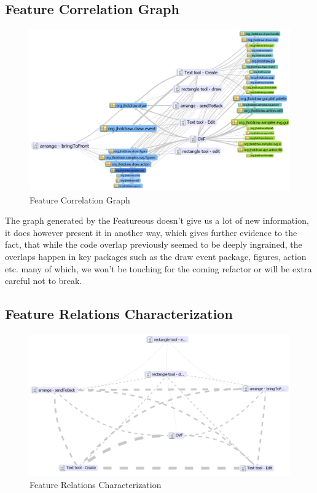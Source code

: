\subsection{Feature Correlation Graph}
\begin{figure}[H]
    \includegraphics[width=\textwidth]{Images/featureousgraph.png}
    \caption{Feature Correlation Graph}
\end{figure}
The graph generated by the Featureous doesn't give us a lot of new information, it does however present it in another way, which gives further evidence to the fact, that while the code overlap previously seemed to be deeply ingrained, the overlaps happen in key packages such as the draw event package, figures, action etc. many of which, we won't be touching for the coming refactor or will be extra careful not to break.

\subsection{Feature Relations Characterization}
\begin{figure}[H]
    \includegraphics[width=\textwidth]{Images/featureousrelations.png}
    \caption{Feature Relations Characterization}
\end{figure}

